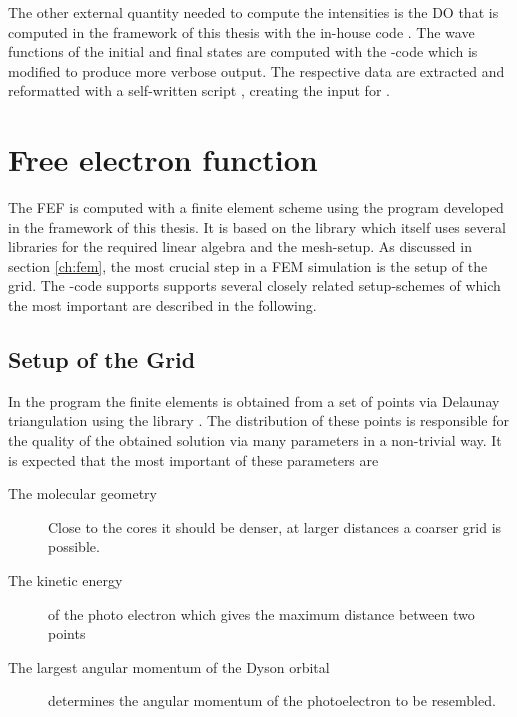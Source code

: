 The other external quantity needed to compute the intensities is the DO that is computed in the framework of this thesis with the in-house code  \cite{MAgg}.
The wave functions of the initial and final states are computed with the -code which is modified to produce more verbose output.
The respective data are extracted and reformatted with a self-written script \cite{nwc2dy}, creating the input for .

\section{Free electron function}
The FEF is computed with a finite element scheme using the program  \cite{FreeWilly} developed in the framework of this thesis.
It is based on the library  \cite{libmesh} which itself uses several libraries for the required linear algebra and the mesh-setup.
As discussed in section \ref{ch:fem}, the most crucial step in a FEM simulation is the setup of the grid.
The -code supports supports several closely related setup-schemes of which the most important are described in the following.

\subsection{Setup of the Grid}
\label{sec:grid}
In the program  the finite elements is obtained from a set of points via Delaunay triangulation %
using the library  \cite{tetgen}.
The distribution of these points is responsible for the quality of the obtained solution via many parameters in a non-trivial way.
It is expected that the most important of these parameters are
\begin{description}
   \item[The molecular geometry] Close to the cores it should be denser, at larger distances a coarser grid is possible.
   \item[The kinetic energy] of the photo electron which gives the maximum distance between two points
   \item[The largest angular momentum of the Dyson orbital] determines the angular momentum of the photoelectron to be resembled.
\end{description}

